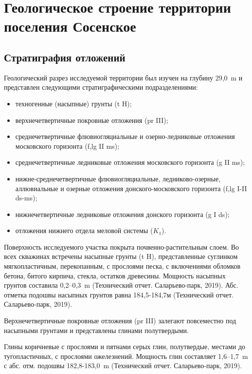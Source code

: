 \chapter{Геологическое строение территории поселения Сосенское}\label{ch:ch2}

\section{Стратиграфия отложений}\label{sec:ch2/sec1}

Геологический разрез исследуемой территории был изучен на глубину 
29,0~\si{\meter} и представлен следующими стратиграфическими подразделениями:

\begin{itemize}
    \item техногенные (насыпные) грунты (t H);
    \item верхнечетвертичные покровные отложения (pr III);
    \item среднечетвертичные флювиогляциальные и озерно-ледниковые отложения московского горизонта (f,lg II ms);
    \item среднечетвертичные ледниковые отложения московского горизонта (g II ms);
    \item нижне-среднечетвертичные флювиогляциальные, ледниково-озерные, аллювиальные и озерные отложения донского-московского горизонта (f,lg I-II ds-ms);
    \item нижнечетвертичные ледниковые отложения донского горизонта (g I ds);
    \item отложения нижнего отдела меловой системы ($K_1$).
\end{itemize}


Поверхность исследуемого участка покрыта почвенно-растительным слоем. 
Во всех скважинах встречены насыпные грунты (t H), представленные суглинком мягкопластичным, 
перекопанным, с прослоями песка, с включениями обломков бетона, битого кирпича, стекла, остатков 
древесины. 
Мощность насыпных грунтов составила 0,2--0,3~\si{\meter} (Технический отчет. Саларьево-парк, 2019). 
Абс. отметка подошвы насыпных грунтов равна 184,5-184,7м (Технический отчет. Саларьево-парк, 2019).

Верхнечетвертичные покровные отложения (pr III) залегают повсеместно под насыпными грунтами и 
представлены глинами полутвердыми.

Глины коричневые с прослоями и пятнами серых глин, полутвердые, местами до тугопластичных, 
с прослоями ожелезнений. 
Мощность глин составляет 1,6--1,7~\si{\meter} с абс. отм. подошвы 182,8-183,0~\si{\meter} 
(Технический отчет. Саларьево-парк, 2019).

